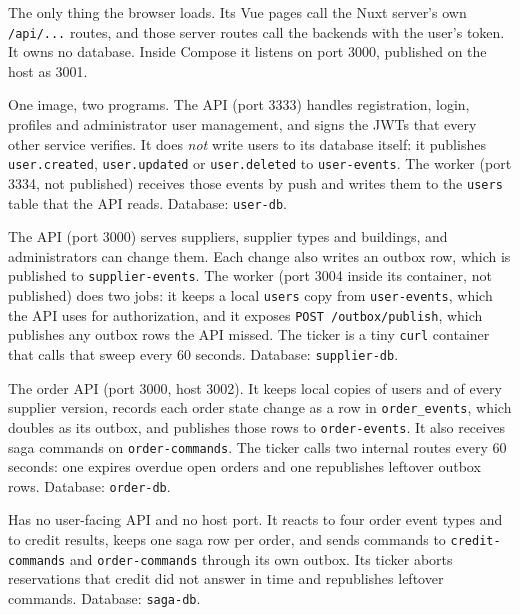 \documentclass[11pt,a4paper]{article}
\newcommand{\code}[1]{\nolinkurl{#1}}
\begin{document}
\begin{description}[style=nextline, leftmargin=0pt, labelsep=0pt, itemsep=4pt]
\item[\code{frontend-service} (Nuxt 4)] The only thing the browser loads. Its Vue pages
call the Nuxt server's own \code{/api/...} routes, and those server routes call the
backends with the user's token. It owns no database. Inside Compose it listens on port
3000, published on the host as 3001.

\item[\code{user-service} and \code{user-event-worker}] One image, two programs. The API
(port 3333) handles registration, login, profiles and administrator user management, and
signs the JWTs that every other service verifies. It does \emph{not} write users to its
database itself: it publishes \code{user.created}, \code{user.updated} or
\code{user.deleted} to \code{user-events}. The worker (port 3334, not published) receives
those events by push and writes them to the \code{users} table that the API reads.
Database: \code{user-db}.

\item[\code{supplier-service}, \code{supplier-event-worker} and \code{supplier-ticker}]
The API (port 3000) serves suppliers, supplier types and buildings, and administrators
can change them. Each change also writes an outbox row, which is published to
\code{supplier-events}. The worker (port 3004 inside its container, not published) does
two jobs: it keeps a local \code{users} copy from \code{user-events}, which the API uses
for authorization, and it exposes \code{POST /outbox/publish}, which publishes any outbox
rows the API missed. The ticker is a tiny \code{curl} container that calls that sweep
every 60 seconds. Database: \code{supplier-db}.

\item[\code{order-service} and \code{order-ticker}] The order API (port 3000, host
3002). It keeps local copies of users and of every supplier version, records each order
state change as a row in \code{order_events}, which doubles as its outbox, and publishes
those rows to \code{order-events}. It also receives saga commands on
\code{order-commands}. The ticker calls two internal routes every 60 seconds: one expires
overdue open orders and one republishes leftover outbox rows. Database: \code{order-db}.

\item[\code{saga-orchestrator} and \code{saga-ticker}] Has no user-facing API and no
host port. It reacts to four order event types and to credit results, keeps one saga row
per order, and sends commands to \code{credit-commands} and \code{order-commands} through
its own outbox. Its ticker aborts reservations that credit did not answer in time and
republishes leftover commands. Database: \code{saga-db}.


\end{description}
\end{document}
